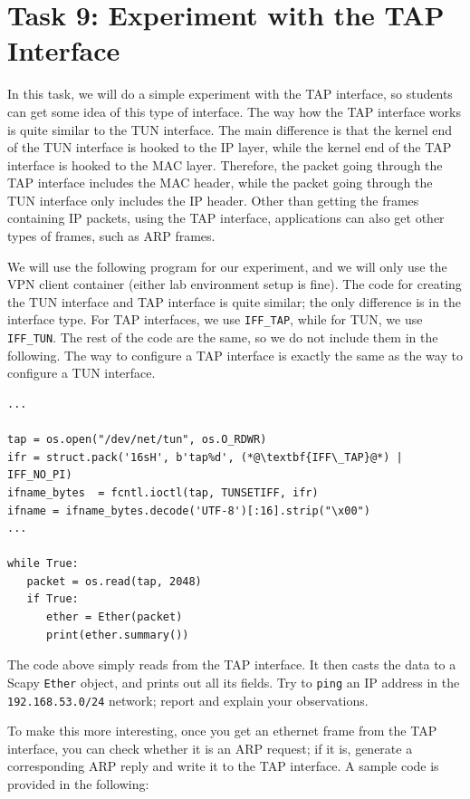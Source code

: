 \section{Task 9: Experiment with the TAP Interface}


In this task, we will do a simple experiment with the TAP interface, so students
can get some idea of this type of interface. The way how the TAP interface works is 
quite similar to the TUN interface. The main difference is that the 
kernel end of the TUN interface is hooked to the IP layer, while the 
kernel end of the TAP interface is hooked to the MAC layer. 
Therefore, the packet going through the TAP interface includes the MAC header,
while the packet going through the TUN interface only includes the IP header. 
Other than getting the frames containing IP packets, using the TAP interface, 
applications can also get other types of frames, such as ARP frames. 


We will use the following program for our experiment, and we will
only use the VPN client container (either lab environment setup is fine).
The code 
for creating the TUN interface and TAP interface is quite similar; the 
only difference is in the interface type. For TAP interfaces, we use
\texttt{IFF\_TAP}, while for TUN,  we use \texttt{IFF\_TUN}.
The rest of the code are the same, so we do not include them in the 
following. The way to configure a TAP interface is exactly the same 
as the way to configure a TUN interface. 


\begin{lstlisting}
...

tap = os.open("/dev/net/tun", os.O_RDWR)
ifr = struct.pack('16sH', b'tap%d', (*@\textbf{IFF\_TAP}@*) | IFF_NO_PI)
ifname_bytes  = fcntl.ioctl(tap, TUNSETIFF, ifr)
ifname = ifname_bytes.decode('UTF-8')[:16].strip("\x00")
... 

while True:
   packet = os.read(tap, 2048)
   if True:
      ether = Ether(packet)
      print(ether.summary())
\end{lstlisting}
 
The code above simply reads from the TAP interface. It then casts 
the data to a Scapy \texttt{Ether} object, and prints out all 
its fields. Try to \texttt{ping} an IP address in
the \texttt{192.168.53.0/24} network; report and explain your observations.  

To make this more interesting, once you get an ethernet frame from the TAP interface,
you can check whether it is an ARP request; if it is, generate a corresponding
ARP reply and write it to the TAP interface. A sample code is provided in the
following:

